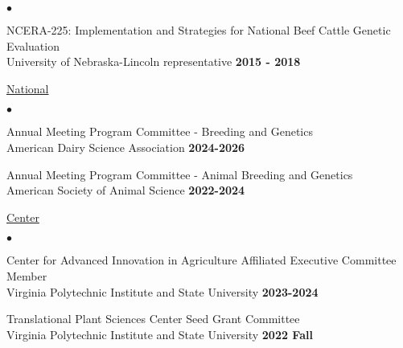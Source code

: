 \documentclass[margin,line,10pt]{res}
\newenvironment{list2}{
  \begin{list}{$\bullet$}{%
      \setlength{\itemsep}{0in}
      \setlength{\parsep}{0in} \setlength{\parskip}{0in}
      \setlength{\topsep}{0in} \setlength{\partopsep}{0in} 
      \setlength{\leftmargin}{0.2in}}}{\end{list}}
\begin{document}
\begin{resume}
\begin{list2}

\item NCERA-225: Implementation and Strategies for National Beef Cattle Genetic Evaluation \\ University of Nebraska-Lincoln representative \hfill  \textbf{2015 - 2018}\\
\end{list2}



\begin{flushleft}
  \hspace{0.3cm} \underline{National}
\end{flushleft}
\begin{list2}

  \item Annual Meeting Program Committee - Breeding and Genetics   \\
American Dairy Science Association   \hfill \textbf{2024-2026}\\

\vspace{0.3cm}

\item Annual Meeting Program Committee - Animal Breeding and Genetics   \\
American Society of Animal Science   \hfill \textbf{2022-2024}\\

\end{list2}



\begin{flushleft}
  \hspace{0.3cm} \underline{Center}
\end{flushleft}
\begin{list2}

  \item Center for Advanced Innovation in Agriculture Affiliated Executive Committee Member \\
  Virginia Polytechnic Institute and State University  \hfill {\bf 2023-2024}\\

  \vspace{0.3cm}

    \item Translational Plant Sciences Center Seed Grant Committee \\
  Virginia Polytechnic Institute and State University  \hfill \textbf{2022 Fall}\\


\end{list2}
\end{resume}
\end{document}
